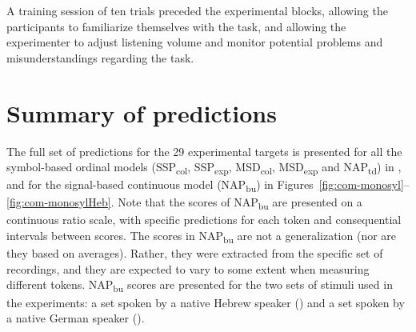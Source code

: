 A training session of ten trials preceded the experimental blocks, allowing the participants to familiarize themselves with the task, and allowing the experimenter to adjust listening volume and monitor potential problems and misunderstandings regarding the task.

\section{Summary of predictions}\label{sec:predictions}

The full set of predictions for the 29 experimental targets is presented for all the symbol-based ordinal models
(SSP\textsubscript{col}, SSP\textsubscript{exp}, MSD\textsubscript{col}, MSD\textsubscript{exp} and NAP\textsubscript{td})
in , and for the signal-based continuous model (NAP\textsubscript{bu}) in Figures~\ref{fig:com-monosyl}--\ref{fig:com-monosylHeb}. Note that the scores of NAP\textsubscript{bu} are presented on a continuous ratio scale, with specific predictions for each token and consequential intervals between scores. The scores in NAP\textsubscript{bu} are not a generalization (nor are they based on averages). Rather, they were extracted from the specific set of recordings, and they are expected to vary to some extent when measuring different tokens. NAP\textsubscript{bu} scores are presented for the two sets of stimuli used in the experiments: a set spoken by a native Hebrew speaker () and a set spoken by a native German speaker ().

